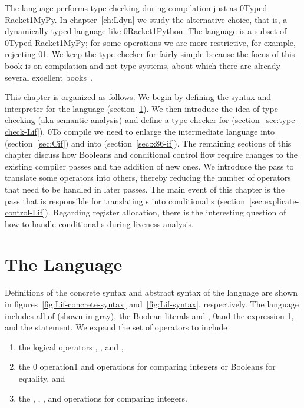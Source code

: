 \documentclass[7x10]{TimesAPriori_MIT}%
\def\racketEd{0}
\def\pythonEd{1}
\def\edition{1}
\newcommand{\racket}[1]{{\if\edition\racketEd{#1}\fi}}
\newcommand{\pythonColor}[0]{}
\newcommand{\python}[1]{{\if\edition\pythonEd\pythonColor #1\fi}}
\numberwithin{theorem}{chapter}
\numberwithin{definition}{chapter}
\numberwithin{equation}{chapter}
\begin{document}
The \LangIf{} language performs type checking during compilation just as
\racket{Typed Racket}\python{MyPy}. In chapter~\ref{ch:Ldyn} we study
the alternative choice, that is, a dynamically typed language like
\racket{Racket}\python{Python}.  The \LangIf{} language is a subset of
\racket{Typed Racket}\python{MyPy}; for some operations we are more
restrictive, for example, rejecting \racket{}\python{}. We keep the type checker for \LangIf{}
fairly simple because the focus of this book is on compilation and not
type systems, about which there are already several excellent
books~\citep{Pierce:2002hj,Pierce:2004fk,Harper2016,Pierce:SF2}.

This chapter is organized as follows.  We begin by defining the syntax
and interpreter for the \LangIf{} language
(section~\ref{sec:lang-if}). We then introduce the idea of type
checking (aka semantic analysis)
and define a type checker for \LangIf{}
(section~\ref{sec:type-check-Lif}).
%
\racket{To compile \LangIf{} we need to enlarge the intermediate
  language \LangCVar{} into \LangCIf{} (section~\ref{sec:Cif}) and
  \LangXInt{} into \LangXIf{} (section~\ref{sec:x86-if}).}
%
The remaining sections of this chapter discuss how Booleans and
conditional control flow require changes to the existing compiler
passes and the addition of new ones. We introduce the 
pass to translate some operators into others, thereby reducing the
number of operators that need to be handled in later passes.
%
The main event of this chapter is the  pass
that is responsible for translating s into conditional
s (section~\ref{sec:explicate-control-Lif}).
%
Regarding register allocation, there is the interesting question of
how to handle conditional s during liveness analysis.


\section{The \LangIf{} Language}
\label{sec:lang-if}

Definitions of the concrete syntax and abstract syntax of the
\LangIf{} language are shown in figures~\ref{fig:Lif-concrete-syntax}
and~\ref{fig:Lif-syntax}, respectively. The \LangIf{} language
includes all of \LangVar{} {(shown in gray)}, the Boolean
literals
\TRUE{} and \FALSE{}, \racket{and} the  expression%
\python{, and the \code{if} statement}. We expand the set of
operators to include
\begin{enumerate}
\item the logical operators , , and ,
\item the \racket{ operation}\python{\key{==} and \key{!=} operations}
  for comparing integers or Booleans for equality, and
\item the \key{<}, \key{<=},
  \key{>}, and
  \key{>=} operations for
  comparing integers.
\end{enumerate}
\end{document}
